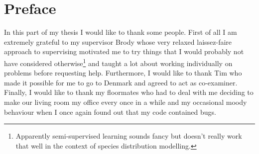 \chapter{Preface}
\label{ch:Preface}
In this part of my thesis I would like to thank some people. First of all I am extremely grateful to my supervisor Brody whose very relaxed laissez-faire approach to supervising motivated me to try things that I would probably not have considered otherwise\footnote{Apparently semi-supervised learning sounds fancy but doesn't really work that well in the context of species distribution modelling.} and taught a lot about working individually on problems before requesting help. Furthermore, I would like to thank Tim who made it possible for me to go to Denmark and agreed to act as co-examiner. Finally, I would like to thank my floormates who had to deal with me deciding to make our living room my office every once in a while and my occasional moody behaviour when I once again found out that my code contained bugs.